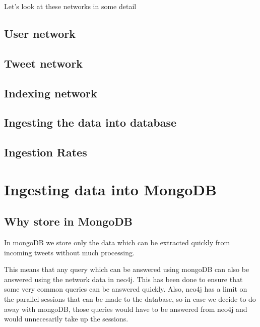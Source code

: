 \documentclass[letterpaper,10pt,english]{sphinxmanual}
\begin{document}
Let’s look at these networks in some detail


\section{User network}
\label{\detokenize{neo4j_data_ingestion:user-network}}
\noindent{}

\noindent{}


\section{Tweet network}
\label{\detokenize{neo4j_data_ingestion:tweet-network}}
\noindent{}


\section{Indexing network}
\label{\detokenize{neo4j_data_ingestion:indexing-network}}
\noindent{}


\section{Ingesting the data into database}
\label{\detokenize{neo4j_data_ingestion:ingesting-the-data-into-database}}

\section{Ingestion Rates}
\label{\detokenize{neo4j_data_ingestion:ingestion-rates}}
\noindent{}


\chapter{Ingesting data into MongoDB}
\label{\detokenize{mongoDB_data_ingestion:ingesting-data-into-mongodb}}\label{\detokenize{mongoDB_data_ingestion::doc}}

\section{Why store in MongoDB}
\label{\detokenize{mongoDB_data_ingestion:why-store-in-mongodb}}
In mongoDB we store only the data which can be extracted quickly from incoming tweets without much processing.

This means that any query which can be answered using mongoDB can also be answered using the network data in neo4j. This has been done to ensure that some very common queries can be answered quickly. Also, neo4j has a limit on the parallel sessions that can be made to the database, so in case we decide to do away with mongoDB, those queries would have to be answered from neo4j and would unnecesarily take up the sessions.
\end{document}
